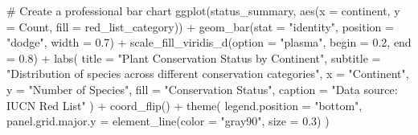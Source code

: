 \documentclass[
  letterpaper,
]{book}
\newenvironment{Shaded}{\begin{snugshade}}{\end{snugshade}}
\newcommand{\AttributeTok}[1]{\textcolor[rgb]{0.40,0.45,0.13}{#1}}
\newcommand{\CommentTok}[1]{\textcolor[rgb]{0.37,0.37,0.37}{#1}}
\newcommand{\FloatTok}[1]{\textcolor[rgb]{0.68,0.00,0.00}{#1}}
\newcommand{\FunctionTok}[1]{\textcolor[rgb]{0.28,0.35,0.67}{#1}}
\newcommand{\NormalTok}[1]{\textcolor[rgb]{0.00,0.23,0.31}{#1}}
\newcommand{\SpecialCharTok}[1]{\textcolor[rgb]{0.37,0.37,0.37}{#1}}
\newcommand{\StringTok}[1]{\textcolor[rgb]{0.13,0.47,0.30}{#1}}
\begin{document}
\begin{Shaded}
\begin{Highlighting}[]
\CommentTok{\# Create a professional bar chart}
\FunctionTok{ggplot}\NormalTok{(status\_summary, }\FunctionTok{aes}\NormalTok{(}\AttributeTok{x =}\NormalTok{ continent, }\AttributeTok{y =}\NormalTok{ Count, }\AttributeTok{fill =}\NormalTok{ red\_list\_category)) }\SpecialCharTok{+}
  \FunctionTok{geom\_bar}\NormalTok{(}\AttributeTok{stat =} \StringTok{"identity"}\NormalTok{, }\AttributeTok{position =} \StringTok{"dodge"}\NormalTok{, }\AttributeTok{width =} \FloatTok{0.7}\NormalTok{) }\SpecialCharTok{+}
  \FunctionTok{scale\_fill\_viridis\_d}\NormalTok{(}\AttributeTok{option =} \StringTok{"plasma"}\NormalTok{, }\AttributeTok{begin =} \FloatTok{0.2}\NormalTok{, }\AttributeTok{end =} \FloatTok{0.8}\NormalTok{) }\SpecialCharTok{+}
  \FunctionTok{labs}\NormalTok{(}
    \AttributeTok{title =} \StringTok{"Plant Conservation Status by Continent"}\NormalTok{,}
    \AttributeTok{subtitle =} \StringTok{"Distribution of species across different conservation categories"}\NormalTok{,}
    \AttributeTok{x =} \StringTok{"Continent"}\NormalTok{,}
    \AttributeTok{y =} \StringTok{"Number of Species"}\NormalTok{,}
    \AttributeTok{fill =} \StringTok{"Conservation Status"}\NormalTok{,}
    \AttributeTok{caption =} \StringTok{"Data source: IUCN Red List"}
\NormalTok{  ) }\SpecialCharTok{+}
  \FunctionTok{coord\_flip}\NormalTok{() }\SpecialCharTok{+}
  \FunctionTok{theme}\NormalTok{(}
    \AttributeTok{legend.position =} \StringTok{"bottom"}\NormalTok{,}
    \AttributeTok{panel.grid.major.y =} \FunctionTok{element\_line}\NormalTok{(}\AttributeTok{color =} \StringTok{"gray90"}\NormalTok{, }\AttributeTok{size =} \FloatTok{0.3}\NormalTok{)}
\NormalTok{  )}
\end{Highlighting}
\end{Shaded}
\end{document}
